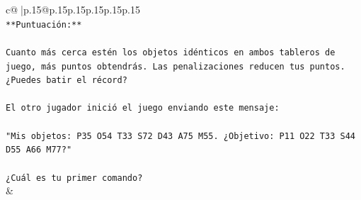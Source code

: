 \documentclass{article}
\begin{document}
{\begin{supertabular}{c@{$\;$}|p{.15\linewidth}@{}p{.15\linewidth}p{.15\linewidth}p{.15\linewidth}p{.15\linewidth}p{.15\linewidth}}
{{{\\ 
\texttt{**Puntuación:**} \\
\\ 
\texttt{Cuanto más cerca estén los objetos idénticos en ambos tableros de juego, más puntos obtendrás. Las penalizaciones reducen tus puntos. ¿Puedes batir el récord?} \\
\\ 
\texttt{El otro jugador inició el juego enviando este mensaje:} \\
\\ 
\texttt{"Mis objetos: P35 O54 T33 S72 D43 A75 M55. ¿Objetivo: P11 O22 T33 S44 D55 A66 M77?"} \\
\\ 
\texttt{¿Cuál es tu primer comando?} \\
            }
        }
    }
    & \\ \\


\end{supertabular}}
\end{document}

